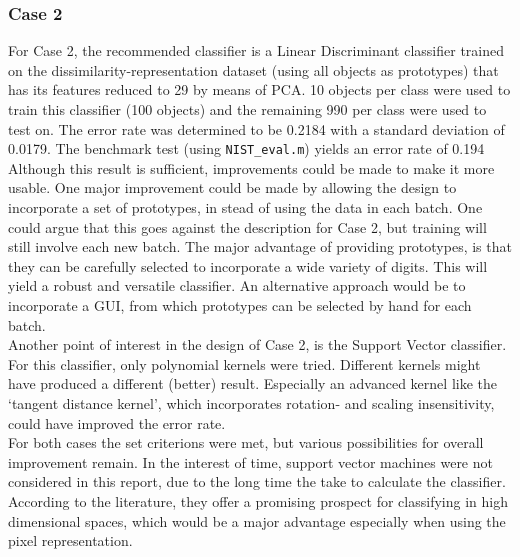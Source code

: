 \subsubsection*{Case 2}
For Case 2, the recommended classifier is a Linear Discriminant classifier trained on the dissimilarity-representation dataset (using all objects as prototypes) that has its features reduced to 29 by means of PCA. 10 objects per class were used to train this classifier (100 objects) and the remaining 990 per class were used to test on. The error rate was determined to be 0.2184 with a standard deviation of 0.0179. The benchmark test (using \texttt{NIST\_eval.m}) yields an error rate of 0.194\\
Although this result is sufficient, improvements could be made to make it more usable. One major improvement could be made by allowing the design to incorporate a set of prototypes, in stead of using the data in each batch. One could argue that this goes against the description for Case 2, but training will still involve each new batch. The major advantage of providing prototypes, is that they can be carefully selected to incorporate a wide variety of digits. This will yield a robust and versatile classifier. An alternative approach would be to incorporate a GUI, from which prototypes can be selected by hand for each batch. \\
Another point of interest in the design of Case 2, is the Support Vector classifier. For this classifier, only polynomial kernels were tried. Different kernels might have produced a different (better) result. Especially an advanced kernel like the ‘tangent distance kernel’, which incorporates rotation- and scaling insensitivity, could have improved the error rate.\\


\noindent For both cases the set criterions were met, but various possibilities for overall improvement remain. In the interest of time, support vector machines were not considered in this report, due to the long time the take to calculate the classifier. According to the literature, they offer a promising prospect for classifying in high dimensional spaces, which would be a major advantage especially when using the pixel  representation.

